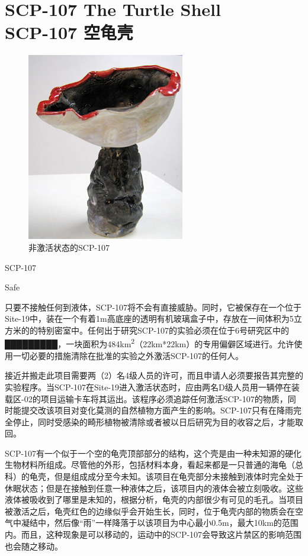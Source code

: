 \chapter[SCP-107 空龟壳]{
    SCP-107 The Turtle Shell\\
    SCP-107 空龟壳
}

\label{chap:SCP-107}

\begin{figure}[H]
    \centering
    \includegraphics[width=0.5\linewidth]{images/SCP.107.jpg}
    \caption*{非激活状态的SCP-107}
\end{figure}

SCP-107

Safe

只要不接触任何到液体，SCP-107将不会有直接威胁。同时，它被保存在一个位于Site-19中，装在一个有着1m高底座的透明有机玻璃盒子中，存放在一间体积为5立方米的的特别密室中。任何出于研究SCP-107的实验必须在位于6号研究区中的█████████，一块面积为484km\textsuperscript{2}（22km*22km）的专用偏僻区域进行。允许使用一切必要的措施清除在批准的实验之外激活SCP-107的任何人。

接近并搬走此项目需要两（2）名4级人员的许可，而且申请人必须要报告其完整的实验程序。当SCP-107在Site-19进入激活状态时，应由两名D级人员用一辆停在装载区-02的项目运输卡车将其运出。该程序必须追踪任何激活SCP-107的物质，同时能提交改该项目对变化莫测的自然植物方面产生的影响。SCP-107只有在降雨完全停止，同时受感染的畸形植物被清除或者被以日后研究为目的收容之后，才能取回。

SCP-107有一个似于一个空的龟壳顶部部分的结构，这个壳是由一种未知源的硬化生物材料所组成。尽管他的外形，包括材料本身，看起来都是一只普通的海龟（总科）的龟壳，但是组成成分至今未知。该项目在龟壳部分未接触到液体时完全处于休眠状态；但是在接触到任意一种液体之后，该项目内的液体会被立刻吸收。这些液体被吸收到了哪里是未知的，根据分析，龟壳的内部很少有可见的毛孔。当项目被激活之后，龟壳红色的边缘似乎会开始生长，同时，位于龟壳内部的物质会在空气中凝结中，然后像“雨”一样降落于以该项目为中心最小0.5m，最大10km的范围内。而且，这种现象是可以移动的，运动中的SCP-107会导致这片禁区的影响范围也会随之移动。


